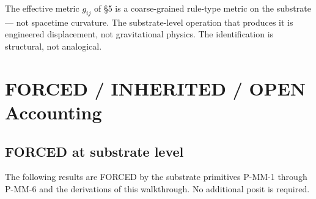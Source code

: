 \documentclass[11pt,a4paper]{article}
\begin{document}
The effective metric $g_{ij}$ of \S5 is a coarse-grained rule-type metric on the substrate --- not spacetime curvature. The substrate-level operation that produces it is engineered displacement, not gravitational physics. The identification is structural, not analogical.

\section{FORCED / INHERITED / OPEN Accounting}

\subsection{FORCED at substrate level}

The following results are FORCED by the substrate primitives P-MM-1 through P-MM-6 and the derivations of this walkthrough. No additional posit is required.
\end{document}
